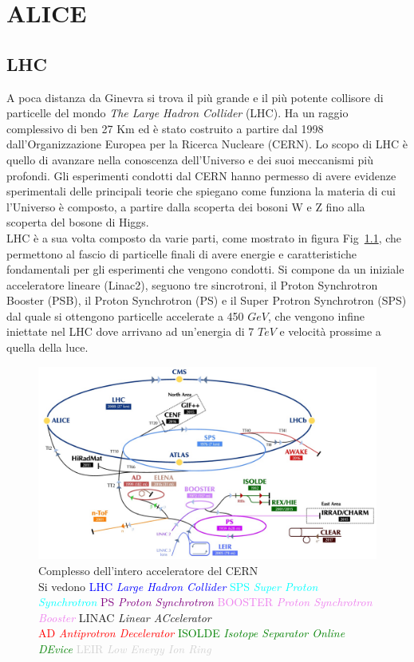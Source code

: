 \chapter{ALICE}

\section{LHC}
A poca distanza da Ginevra si trova il più grande e il più potente collisore di particelle del mondo \textit{The Large Hadron Collider} (LHC). Ha un raggio complessivo di ben 27 Km ed è stato costruito a partire dal 1998 dall'Organizzazione Europea per la Ricerca Nucleare (CERN). Lo scopo di LHC è quello di avanzare nella conoscenza dell'Universo e dei suoi meccanismi più profondi. Gli esperimenti condotti dal CERN hanno permesso di avere evidenze sperimentali delle principali teorie che spiegano come funziona la materia di cui l'Universo è composto,  a partire dalla scoperta dei bosoni W e Z fino alla scoperta del bosone di Higgs. 
\\LHC è a sua volta composto da varie parti, come mostrato in figura Fig~\ref{fig:CERNcomplex}, che permettono al fascio di particelle finali di avere energie e caratteristiche fondamentali per gli esperimenti che vengono condotti. Si compone da un iniziale acceleratore lineare (Linac2), seguono tre sincrotroni, il Proton Synchrotron Booster (PSB), il Proton Synchrotron (PS) e il Super Protron Synchrotron (SPS) dal quale si ottengono particelle accelerate a 450 $GeV$, che vengono infine iniettate nel LHC dove arrivano ad un'energia di 7 $TeV$ e velocità prossime a quella della luce. \cite{tesi_barbano}
  \captionsetup{justification=centerlast} 
    \begin{figure}[htbp]
        \centering
        \includegraphics[width=0.8\linewidth]{ALICE/CernComplex_2018.png}        \caption{Complesso dell'intero acceleratore del CERN \\\small{Si vedono  \textcolor{blue}{LHC \textit{Large Hadron Collider}} \textcolor{cyan}{SPS \textit{Super Proton Synchrotron}} \textcolor{purple}{ PS \textit{Proton Synchrotron}} \textcolor{violet}{BOOSTER \textit{ Proton Synchrotron Booster}} LINAC \textit{Linear ACcelerator}} \\{\footnotesize  \textcolor{red}{AD \textit{Antiprotron Decelerator}} \textcolor{green}{ISOLDE \textit{Isotope Separator Online DEvice}}  \textcolor{lightgray}{LEIR \textit{Low Energy Ion Ring}} }}
        \label{fig:CERNcomplex}
    \end{figure}
    
